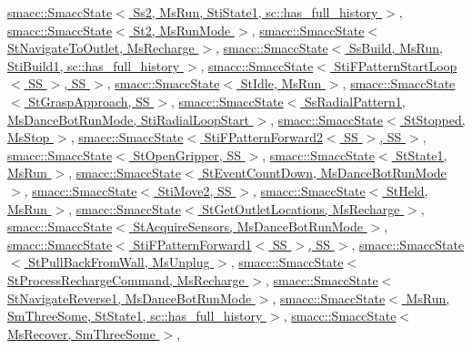 \hyperlink{classsmacc_1_1SmaccState_afc39f8e0ca4001b2159a100da2fccd0e}{smacc\+::\+Smacc\+State$<$ Ss2, Ms\+Run, Sti\+State1, sc\+::has\+\_\+full\+\_\+history $>$}, \hyperlink{classsmacc_1_1SmaccState_afc39f8e0ca4001b2159a100da2fccd0e}{smacc\+::\+Smacc\+State$<$ St2, Ms\+Run\+Mode $>$}, \hyperlink{classsmacc_1_1SmaccState_afc39f8e0ca4001b2159a100da2fccd0e}{smacc\+::\+Smacc\+State$<$ St\+Navigate\+To\+Outlet, Ms\+Recharge $>$}, \hyperlink{classsmacc_1_1SmaccState_afc39f8e0ca4001b2159a100da2fccd0e}{smacc\+::\+Smacc\+State$<$ Ss\+Build, Ms\+Run, Sti\+Build1, sc\+::has\+\_\+full\+\_\+history $>$}, \hyperlink{classsmacc_1_1SmaccState_afc39f8e0ca4001b2159a100da2fccd0e}{smacc\+::\+Smacc\+State$<$ Sti\+F\+Pattern\+Start\+Loop$<$ S\+S $>$, S\+S $>$}, \hyperlink{classsmacc_1_1SmaccState_afc39f8e0ca4001b2159a100da2fccd0e}{smacc\+::\+Smacc\+State$<$ St\+Idle, Ms\+Run $>$}, \hyperlink{classsmacc_1_1SmaccState_afc39f8e0ca4001b2159a100da2fccd0e}{smacc\+::\+Smacc\+State$<$ St\+Grasp\+Approach, S\+S $>$}, \hyperlink{classsmacc_1_1SmaccState_afc39f8e0ca4001b2159a100da2fccd0e}{smacc\+::\+Smacc\+State$<$ Ss\+Radial\+Pattern1, Ms\+Dance\+Bot\+Run\+Mode, Sti\+Radial\+Loop\+Start $>$}, \hyperlink{classsmacc_1_1SmaccState_afc39f8e0ca4001b2159a100da2fccd0e}{smacc\+::\+Smacc\+State$<$ St\+Stopped, Ms\+Stop $>$}, \hyperlink{classsmacc_1_1SmaccState_afc39f8e0ca4001b2159a100da2fccd0e}{smacc\+::\+Smacc\+State$<$ Sti\+F\+Pattern\+Forward2$<$ S\+S $>$, S\+S $>$}, \hyperlink{classsmacc_1_1SmaccState_afc39f8e0ca4001b2159a100da2fccd0e}{smacc\+::\+Smacc\+State$<$ St\+Open\+Gripper, S\+S $>$}, \hyperlink{classsmacc_1_1SmaccState_afc39f8e0ca4001b2159a100da2fccd0e}{smacc\+::\+Smacc\+State$<$ St\+State1, Ms\+Run $>$}, \hyperlink{classsmacc_1_1SmaccState_afc39f8e0ca4001b2159a100da2fccd0e}{smacc\+::\+Smacc\+State$<$ St\+Event\+Count\+Down, Ms\+Dance\+Bot\+Run\+Mode $>$}, \hyperlink{classsmacc_1_1SmaccState_afc39f8e0ca4001b2159a100da2fccd0e}{smacc\+::\+Smacc\+State$<$ Sti\+Move2, S\+S $>$}, \hyperlink{classsmacc_1_1SmaccState_afc39f8e0ca4001b2159a100da2fccd0e}{smacc\+::\+Smacc\+State$<$ St\+Held, Ms\+Run $>$}, \hyperlink{classsmacc_1_1SmaccState_afc39f8e0ca4001b2159a100da2fccd0e}{smacc\+::\+Smacc\+State$<$ St\+Get\+Outlet\+Locations, Ms\+Recharge $>$}, \hyperlink{classsmacc_1_1SmaccState_afc39f8e0ca4001b2159a100da2fccd0e}{smacc\+::\+Smacc\+State$<$ St\+Acquire\+Sensors, Ms\+Dance\+Bot\+Run\+Mode $>$}, \hyperlink{classsmacc_1_1SmaccState_afc39f8e0ca4001b2159a100da2fccd0e}{smacc\+::\+Smacc\+State$<$ Sti\+F\+Pattern\+Forward1$<$ S\+S $>$, S\+S $>$}, \hyperlink{classsmacc_1_1SmaccState_afc39f8e0ca4001b2159a100da2fccd0e}{smacc\+::\+Smacc\+State$<$ St\+Pull\+Back\+From\+Wall, Ms\+Unplug $>$}, \hyperlink{classsmacc_1_1SmaccState_afc39f8e0ca4001b2159a100da2fccd0e}{smacc\+::\+Smacc\+State$<$ St\+Process\+Recharge\+Command, Ms\+Recharge $>$}, \hyperlink{classsmacc_1_1SmaccState_afc39f8e0ca4001b2159a100da2fccd0e}{smacc\+::\+Smacc\+State$<$ St\+Navigate\+Reverse1, Ms\+Dance\+Bot\+Run\+Mode $>$}, \hyperlink{classsmacc_1_1SmaccState_afc39f8e0ca4001b2159a100da2fccd0e}{smacc\+::\+Smacc\+State$<$ Ms\+Run, Sm\+Three\+Some, St\+State1, sc\+::has\+\_\+full\+\_\+history $>$}, \hyperlink{classsmacc_1_1SmaccState_afc39f8e0ca4001b2159a100da2fccd0e}{smacc\+::\+Smacc\+State$<$ Ms\+Recover, Sm\+Three\+Some $>$}, 